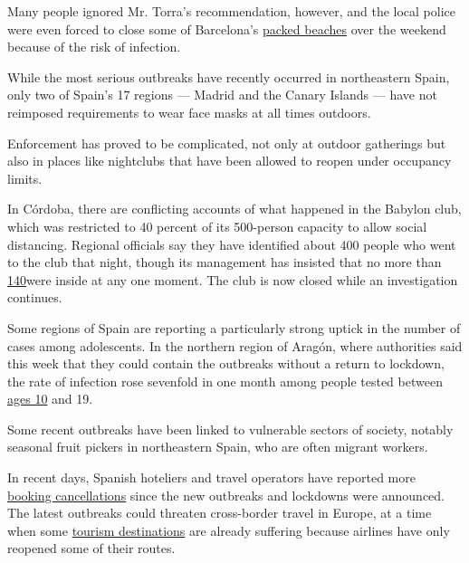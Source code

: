Many people ignored Mr. Torra's recommendation, however, and the local
police were even forced to close some of Barcelona's
\href{https://www.lavanguardia.com/local/barcelona/20200719/482405928973/barcelona-cierre-playas-covid19-coronavirus.html}{packed
beaches} over the weekend because of the risk of infection.

While the most serious outbreaks have recently occurred in northeastern
Spain, only two of Spain's 17 regions --- Madrid and the Canary Islands
--- have not reimposed requirements to wear face masks at all times
outdoors.

Enforcement has proved to be complicated, not only at outdoor gatherings
but also in places like nightclubs that have been allowed to reopen
under occupancy limits.

In Córdoba, there are conflicting accounts of what happened in the
Babylon club, which was restricted to 40 percent of its 500-person
capacity to allow social distancing. Regional officials say they have
identified about 400 people who went to the club that night, though its
management has insisted that no more than
\href{https://www.eldiadecordoba.es/cordoba/Babylonia-defiende-cumplio-fiestas-covid-19_0_1483652062.html}{140}were
inside at any one moment. The club is now closed while an investigation
continues.

Some regions of Spain are reporting a particularly strong uptick in the
number of cases among adolescents. In the northern region of Aragón,
where authorities said this week that they could contain the outbreaks
without a return to lockdown, the rate of infection rose sevenfold in
one month among people tested between
\href{https://www.elperiodicodearagon.com/noticias/aragon/incidencia-virus-jovenes-10-19-anos-multiplica-siete_1428795.html}{ages
10} and 19.

Some recent outbreaks have been linked to vulnerable sectors of society,
notably seasonal fruit pickers in northeastern Spain, who are often
migrant workers.

In recent days, Spanish hoteliers and travel operators have reported
more
\href{https://www.lavanguardia.com/economia/20200723/482471747725/rebrotes-gestion-frenan-seco-remontada-turistica.html}{booking
cancellations} since the new outbreaks and lockdowns were announced. The
latest outbreaks could threaten cross-border travel in Europe, at a time
when some
\href{https://www.nytimes3xbfgragh.onion/2020/07/19/world/europe/tourism-virus-europe.html}{tourism
destinations} are already suffering because airlines have only reopened
some of their routes.

